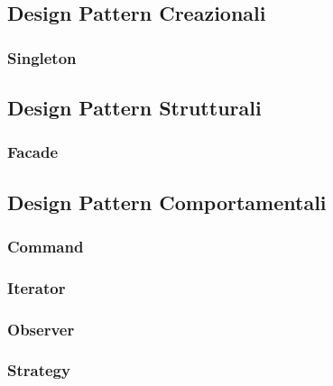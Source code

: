 \documentclass{scalatekids-article}
\begin{document}
\subsection{Design Pattern Creazionali}

\subsubsection{Singleton}

\subsection{Design Pattern Strutturali}

\subsubsection{Facade}

\subsection{Design Pattern Comportamentali}

\subsubsection{Command}

\subsubsection{Iterator}

\subsubsection{Observer}

\subsubsection{Strategy}

\listoftables
\listoffigures
\end{document}
